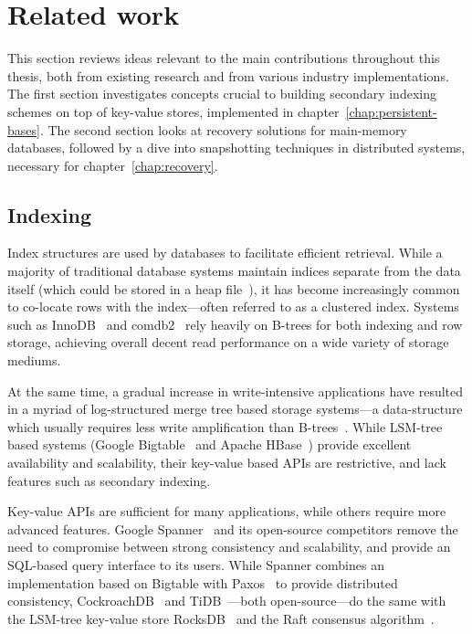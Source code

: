 \chapter{Related work}\label{chap:related-work}

This section reviews ideas relevant to the main contributions throughout this
thesis, both from existing research and from various industry implementations.
The first section investigates concepts crucial to building secondary indexing
schemes on top of key-value stores, implemented in
chapter~\ref{chap:persistent-bases}. The second section looks at recovery
solutions for main-memory databases, followed by a dive into snapshotting
techniques in distributed systems, necessary for chapter~\ref{chap:recovery}.

\newpage

\section{Indexing}\label{sec:indexing}

Index structures are used by databases to facilitate efficient retrieval. While
a majority of traditional database systems maintain indices separate from the
data itself (which could be stored in \eg a heap file~\cite{microsoft-heap,
psql-heap}), it has become increasingly common to co-locate rows with the
index---often referred to as a clustered index. Systems such as
InnoDB~\cite{innodb-source} and comdb2~\cite{comdb2} rely heavily on B-trees for
both indexing and row storage, achieving overall decent read performance on a
wide variety of storage mediums.

At the same time, a gradual increase in write-intensive applications have
resulted in a myriad of log-structured merge tree based storage systems---a
data-structure which usually requires less write amplification than
B-trees~\cite{lsm-vs-b}. While LSM-tree based systems (\eg Google
Bigtable~\cite{bigtable} and Apache HBase~\cite{hbase}) provide excellent
availability and scalability, their key-value based APIs are restrictive, and
lack features such as secondary indexing.

Key-value APIs are sufficient for many applications, while others require more
advanced features. Google Spanner~\cite{spanner} and its open-source competitors
remove the need to compromise between strong consistency and scalability, and
provide an SQL-based query interface to its users. While Spanner combines an
implementation based on Bigtable with Paxos~\cite{paxos} to provide distributed
consistency, CockroachDB~\cite{cockroach} and TiDB~\cite{tidb}---both
open-source---do the same with the LSM-tree key-value store
RocksDB~\cite{rocksdb} and the Raft consensus algorithm~\cite{raft}.

